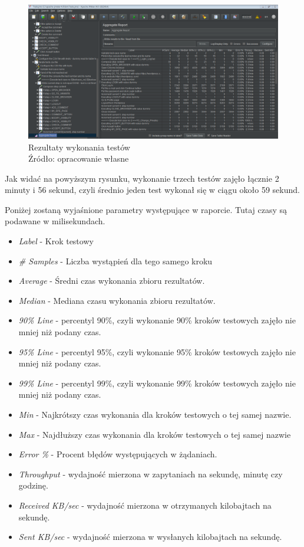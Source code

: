 \begin{figure}[H]
\centering
\captionsetup{justification=centering}
\includegraphics[width=1\textwidth]{results.PNG}
\caption[Rezultaty wykonania testów]{\label{fig:ham}Rezultaty wykonania testów \\ Źródło: opracowanie własne}
\end{figure}

Jak widać na powyższym rysunku, wykonanie trzech testów zajęło łącznie 2 minuty i 56 sekund, czyli średnio jeden test wykonał się w ciągu około 59 sekund.


Poniżej zostaną wyjaśnione parametry występujące w raporcie. Tutaj czasy są podawane w milisekundach.

\begin{itemize}
    \item \textit{Label} - Krok testowy
    \item \textit{\# Samples} - Liczba wystąpień dla tego samego kroku
    \item \textit{Average} - Średni czas wykonania zbioru rezultatów.
    \item \textit{Median} - Mediana czasu wykonania zbioru rezultatów.
    \item \textit{90\% Line} - percentyl 90\%, czyli wykonanie 90\% kroków testowych zajęło nie mniej niż podany czas.
    \item \textit{95\% Line} - percentyl 95\%, czyli wykonanie 95\% kroków testowych zajęło nie mniej niż podany czas.
    \item \textit{99\% Line} - percentyl 99\%, czyli wykonanie 99\% kroków testowych zajęło nie mniej niż podany czas.
    \item \textit{Min} - Najkrótszy czas wykonania dla kroków testowych o tej samej nazwie.
    \item \textit{Max} - Najdłuższy czas wykonania dla kroków testowych o tej samej nazwie
    \item \textit{Error \%} - Procent błędów występujących w żądaniach.
    \item \textit{Throughput} - wydajność mierzona w zapytaniach na sekundę, minutę czy godzinę.
    \item \textit{Received KB/sec} - wydajność mierzona w otrzymanych kilobajtach na sekundę.
    \item \textit{Sent KB/sec} - wydajność mierzona w wysłanych kilobajtach na sekundę.
\end{itemize}



